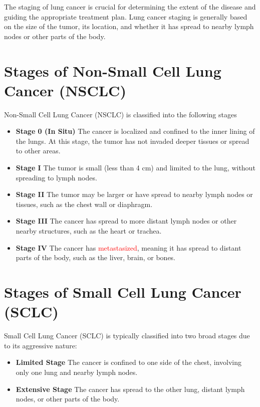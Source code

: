 The staging of lung cancer is crucial for determining the extent of the disease and guiding the appropriate treatment plan. Lung cancer staging is generally based on the size of the tumor, its location, and whether it has spread to nearby lymph nodes or other parts of the body.

\section{Stages of Non-Small Cell Lung Cancer (NSCLC)}
Non-Small Cell Lung Cancer (NSCLC) is classified into the following stages \cite{wu2024alectinib}
\begin{highlight}
\begin{itemize}
    \item \textbf{Stage 0 (In Situ)} The cancer is localized and confined to the inner lining of the lungs. At this stage, the tumor has not invaded deeper tissues or spread to other areas.
    \item \textbf{Stage I} The tumor is small (less than 4 cm) and limited to the lung, without spreading to lymph nodes.
    \item \textbf{Stage II} The tumor may be larger or have spread to nearby lymph nodes or tissues, such as the chest wall or diaphragm.
    \item \textbf{Stage III} The cancer has spread to more distant lymph nodes or other nearby structures, such as the heart or trachea.
    \item \textbf{Stage IV} The cancer has \textcolor{red}{metastasized}, meaning it has spread to distant parts of the body, such as the liver, brain, or bones.
\end{itemize}
\end{highlight}

\section{Stages of Small Cell Lung Cancer (SCLC)} 
Small Cell Lung Cancer (SCLC) \cite{cheng2024durvalumab} is typically classified into two broad stages due to its aggressive nature:
\begin{remark}
\begin{itemize}
    \item \textbf{Limited Stage} The cancer is confined to one side of the chest, involving only one lung and nearby lymph nodes.
    \item \textbf{Extensive Stage} The cancer has spread to the other lung, distant lymph nodes, or other parts of the body.
\end{itemize}
\end{remark}

